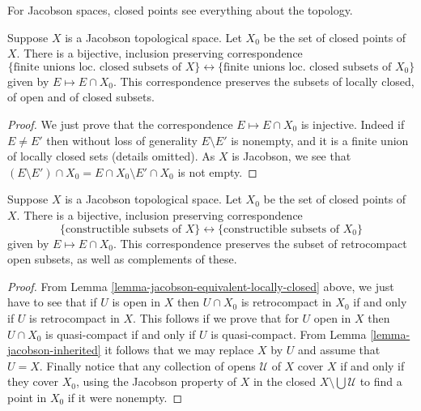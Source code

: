 \begin{lemma}
\label{lemma-jacobson-equivalent-locally-closed}
\begin{slogan}
For Jacobson spaces, closed points see everything about the topology.
\end{slogan}
Suppose $X$ is a Jacobson topological space.
Let $X_0$ be the set of closed points of $X$.
There is a bijective, inclusion preserving correspondence
$$
\{\text{finite unions loc. closed subsets of } X\}
\leftrightarrow
\{\text{finite unions loc. closed subsets of } X_0\}
$$
given by $E \mapsto E \cap X_0$. This correspondence preserves
the subsets of locally closed, of open and of closed subsets.
\end{lemma}

\begin{proof}
We just prove that the correspondence $E \mapsto E \cap X_0$ is injective.
Indeed if $E\neq E'$ then without loss of generality $E\setminus E'$ is
nonempty, and it is a finite union of locally closed sets (details omitted).
As $X$ is Jacobson, we see that
$(E \setminus E') \cap X_0 = E \cap X_0 \setminus E' \cap X_0$ is not empty.
\end{proof}

\begin{lemma}
\label{lemma-jacobson-equivalent-constructible}
Suppose $X$ is a Jacobson topological space.
Let $X_0$ be the set of closed points of $X$.
There is a bijective, inclusion preserving correspondence
$$
\{\text{constructible subsets of } X\}
\leftrightarrow
\{\text{constructible subsets of } X_0\}
$$
given by $E \mapsto E \cap X_0$. This correspondence preserves
the subset of retrocompact open subsets, as well as complements
of these.
\end{lemma}

\begin{proof}
From  Lemma \ref{lemma-jacobson-equivalent-locally-closed} above,
we just have to see that if $U$ is open in $X$ then $U\cap X_0$ is
retrocompact in $X_0$ if and only if $U$ is retrocompact in $X$.
This follows if we prove that for $U$ open in $X$ then $U\cap X_0$ is
quasi-compact if and only if $U$ is quasi-compact.
From  Lemma \ref{lemma-jacobson-inherited} it follows that we may replace
$X$ by $U$ and assume that $U = X$.
Finally notice that any collection of opens $\mathcal{U}$ of $X$ cover
$X$ if and only if they cover $X_0$, using the Jacobson property
of $X$ in the closed $X\setminus \bigcup \mathcal{U}$ to find a point
in $X_0$ if it were nonempty.
\end{proof}



















